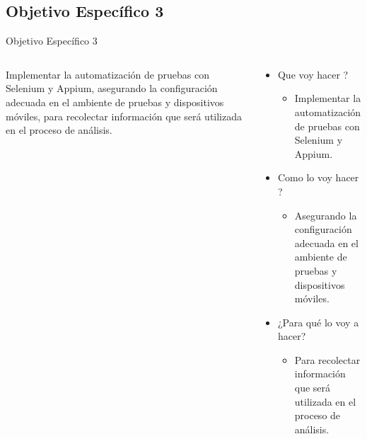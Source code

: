 \documentclass{beamer}
\begin{document}
\subsection{Objetivo Específico 3}
\begin{frame}{Objetivo Específico 3 }
  \begin{columns}
    \begin{column}{0.5\textwidth}
      Implementar la automatización de pruebas con Selenium y Appium, asegurando la configuración adecuada en el ambiente de pruebas y dispositivos móviles, para recolectar información que será utilizada en el proceso de análisis. 
    \end{column}
    \begin{column}{0.5\textwidth}
      \begin{itemize}
          \item Que voy hacer ?
          \begin{itemize}
              \item  Implementar la automatización de pruebas con Selenium y Appium.
          \end{itemize}
          \item Como lo voy hacer ?
          \begin{itemize}
              \item Asegurando la configuración adecuada en el ambiente de pruebas y dispositivos móviles.
          \end{itemize}
         \item ¿Para qué lo voy a hacer?
         \begin{itemize}
              \item Para recolectar información que será utilizada en el proceso de análisis.
          \end{itemize}
      \end{itemize}
    \end{column}
  \end{columns}
\end{frame}
\end{document}

